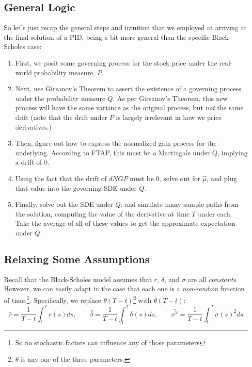 \documentclass[12pt]{article}
\theoremstyle{plain}
\theoremstyle{definition}
\theoremstyle{remark}
\begin{document}
\newpage


\subsection{General Logic}

So let's just recap the general steps and intuition that we employed
at arriving at the final solution of a PID, being a bit more general
than the specific Black-Scholes case:
\begin{enumerate}
   \item{First, we posit some governing process for the stock price
      under the real-world probability measure, $P$.}
   \item{Next, use Girsanov's Theorem to assert the existence of a
      governing process under the probability measure $Q$.  As per 
      Girsanov's Theorem, this new process
      will have the same variance as the
      original process, but \emph{not} the same drift (note that
      the drift under $P$ is largely irrelevant in how we price
      derivatives.)}
   \item{Then, figure out how to express the normalized gain process
      for the underlying. According to FTAP, 
      this must be a Martingale under $Q$, implying a drift of 0.}
   \item{Using the fact that the drift of $dNGP$ must be 0, solve
      out for $\hat{\mu}$, and plug that value into the governing SDE
      under $Q$.}
   \item{Finally, solve out the SDE under $Q$, and simulate many 
      sample paths from the solution, computing the value of 
      the derivative at time $T$ under each. Take the average of all of 
      these values to get the approximate expectation under $Q$.}
\end{enumerate}

\subsection{Relaxing Some Assumptions}

Recall that the Black-Scholes model assumes that $r$, $\delta$, and
$\sigma$ are all \emph{constants}. However, we can easily adapt in the
case that each one is a \emph{non-random} function of 
time.\footnote{So no stochastic factors can influence any of those 
parameters}. Specifically, we replace $\theta (T-t)$\footnote{$\theta$
is any one of the three parameters.} with $\bar{\theta}(T-t)$:
   \[ \bar{r} = \frac{1}{T-t} \int^T_t r(s) ds, \qquad
      \bar{\delta} = \frac{1}{T-t} \int^T_t \delta(s) ds, \qquad
      \bar{\sigma^2} = \frac{1}{T-t} \int^T_t \sigma(s)^2 ds \]
\end{document}
